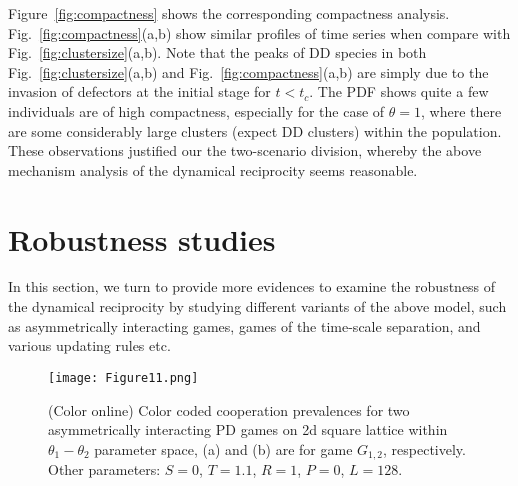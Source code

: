 \documentclass[showpacs,superscriptaddress,reprint,nofootinbib,amsmath,amssymb,aps,pre]{revtex4-1}
\begin{document}
Figure~\ref{fig:compactness} shows the corresponding compactness analysis. Fig.~\ref{fig:compactness}(a,b) show similar profiles of time series when compare with Fig.~\ref{fig:clustersize}(a,b). Note that the peaks of DD species in both Fig.~\ref{fig:clustersize}(a,b) and Fig.~\ref{fig:compactness}(a,b) are simply due to the invasion of defectors at the initial stage for $t<t_c$. The PDF shows quite a few individuals are of high compactness, especially for the case of $\theta=1$, where there are some considerably large clusters (expect DD clusters) within the population.
These observations justified our the two-scenario division, whereby the above mechanism analysis of the dynamical reciprocity seems reasonable.

\section{Robustness studies}\label{sec:robustness}
In this section, we turn to provide more evidences to examine the robustness of the dynamical reciprocity by studying different variants of the above model, such as asymmetrically interacting games, games of the time-scale separation, and various updating rules etc. 
\begin{figure}[htbp]
\centering
\texttt{[image: Figure11.png]}
\caption{(Color online)
Color coded cooperation prevalences for two asymmetrically interacting PD games on 2d square lattice within $\theta_1-\theta_2$ parameter space, (a) and (b) are for game $G_{1,2}$, respectively.
Other parameters: $S=0$, $T=1.1$, $R=1$, $P=0$, $L=128$.
}
\label{fig:asymmetry}
\end{figure}
\end{document}
